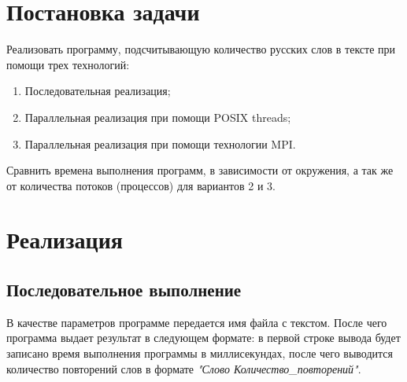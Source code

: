 \documentclass[12pt,a4paper]{report}
\begin{document}
	
	
	\renewcommand{\thesection}{\arabic{section}}
	\tableofcontents
	\pagebreak
	
	\setcounter{totalnumber}{10}
	\setcounter{topnumber}{10}
	\setcounter{bottomnumber}{10}
	\renewcommand{\topfraction}{1}
	\renewcommand{\textfraction}{0}
	
	\section{Постановка задачи}
		Реализовать программу, подсчитывающую количество русских слов в тексте при помощи трех технологий:
		\begin{enumerate}
			\item Последовательная реализация;
			\item Параллельная реализация при помощи POSIX threads;
			\item Параллельная реализация при помощи технологии MPI.
		\end{enumerate}
		Сравнить времена выполнения программ, в зависимости от окружения, а так же от количества потоков (процессов) для вариантов 2 и 3.
	\section{Реализация}
		\subsection{Последовательное выполнение}
			В качестве параметров программе передается имя файла с текстом. После 
			чего программа выдает результат в следующем формате: в первой строке 
			вывода будет записано время выполнения программы в миллисекундах, после 
			чего выводится количество повторений слов в формате \textit{"Слово 
			Количество\_повторений"}.
				
\end{document}

